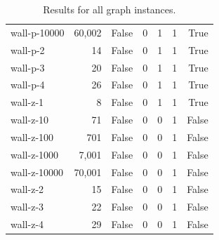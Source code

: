 \begin{table}[ht]
\begin{tabular}{l r c r r r r}
wall-p-10000 & 60,002 & False & 0 & 1 & 1 & True \\
wall-p-2 & 14 & False & 0 & 1 & 1 & True \\
wall-p-3 & 20 & False & 0 & 1 & 1 & True \\
wall-p-4 & 26 & False & 0 & 1 & 1 & True \\
wall-z-1 & 8 & False & 0 & 1 & 1 & True \\
wall-z-10 & 71 & False & 0 & 0 & 1 & False \\
wall-z-100 & 701 & False & 0 & 0 & 1 & False \\
wall-z-1000 & 7,001 & False & 0 & 0 & 1 & False \\
wall-z-10000 & 70,001 & False & 0 & 0 & 1 & False \\
wall-z-2 & 15 & False & 0 & 0 & 1 & False \\
wall-z-3 & 22 & False & 0 & 0 & 1 & False \\
wall-z-4 & 29 & False & 0 & 0 & 1 & False \\
\hline
\end{tabular}
\caption{Results for all graph instances.}
\label{tab:results}
\end{table}
